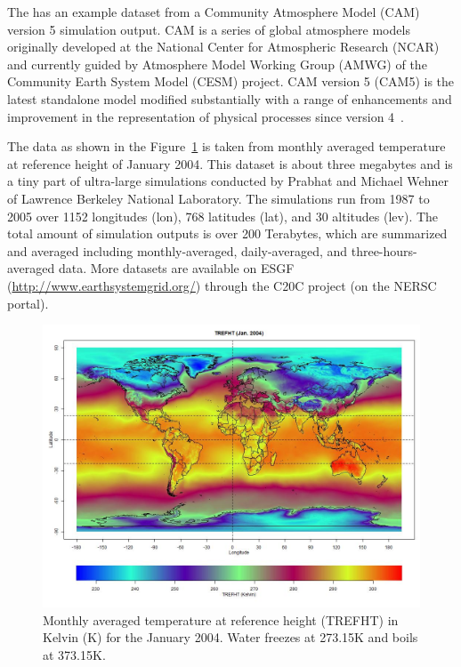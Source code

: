 The  has an example dataset  from a
Community Atmosphere Model (CAM) version 5 simulation output.
CAM is a series of global atmosphere models originally developed at the 
National Center for Atmospheric Research (NCAR) and currently guided by 
Atmosphere Model Working Group (AMWG) of the Community Earth System Model (CESM)
project. CAM version 5 (CAM5) is the latest standalone model modified
substantially with a range of enhancements and improvement in the 
representation of physical processes since version 4~\citep{CAM5,CESM1}.

The data  as shown in the Figure~\ref{fig:trefht}
is taken from monthly averaged temperature at reference height of January 2004.
This dataset is about three megabytes and is a tiny part of ultra-large 
simulations conducted by Prabhat and Michael Wehner of Lawrence Berkeley 
National Laboratory. The simulations run from 1987 to 2005 over 1152 longitudes 
(lon), 768 latitudes (lat), and 30 altitudes (lev). The total amount of 
simulation outputs is over 200 Terabytes, which are summarized and averaged 
including monthly-averaged, daily-averaged, and three-hours-averaged data.
More datasets are available on ESGF (\url{http://www.earthsystemgrid.org/})
through the C20C project (on the NERSC portal).
\begin{figure}[t]
  \centering
  \includegraphics[width=6.0in]{pbdDEMO-include/pics/trefht.jpg}
  \caption[Monthly averaged temperature]{Monthly averaged temperature at reference height (TREFHT) in
           Kelvin (K) for the January 2004. Water freezes at 273.15K and
           boils at 373.15K.}
  \label{fig:trefht}
\end{figure}


